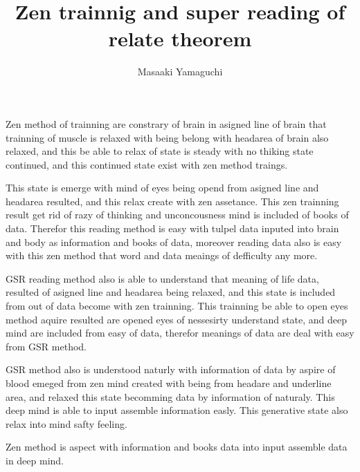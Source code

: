 \documentclass{jsarticle}
\begin{document}
\title{Zen trainnig and super reading of relate theorem}
\author{Masaaki Yamaguchi}
\date{}
\maketitle


       Zen method of trainning are constrary of brain 
       in asigned line of brain that
    trainning of muscle is relaxed with being belong with headarea of brain
    also relaxed, and this be able to relax of state is steady with no thiking
    state continued, and this continued state exist with zen method traings.


       This state is emerge with mind of eyes being opend from asigned line and
    headarea resulted, and this relax create with zen assetance.
    This zen trainning result get rid of razy of thinking and unconcousness
    mind is included of books of data. Therefor this reading method 
    is easy with tulpel data inputed into brain and body as information and
    books of data, moreover reading data also is easy with this zen method
    that word and data meaings of defficulty any more.



       GSR reading method also is able to understand that meaning of life data,
    resulted of asigned line and headarea being relaxed, and this state
    is included from out of data become with zen trainning.
    This trainning be able to open eyes method aquire resulted are 
    opened eyes of nessesirty understand state, and deep mind are included
    from easy of data, therefor meanings of data are deal with easy from
    GSR method.



        GSR method also is understood naturly with information of data by 
     aspire of blood emeged from zen mind created with being from
     headare and underline area, and relaxed this state becomming
     data by information of naturaly. This deep mind is able to input
     assemble information easly. This generative state also relax into mind 
     safty feeling.

        Zen method is aspect with information and books data into input
     assemble data in deep mind.
\end{document}
